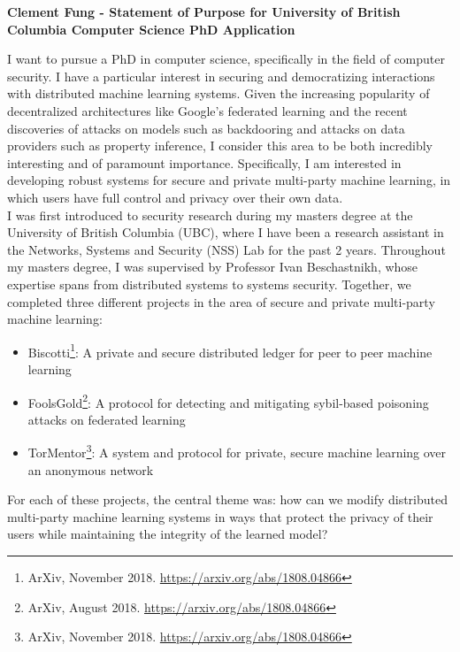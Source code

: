 \documentclass[10pt]{article} %
\begin{document}
\begin{center}
{\large \bf Clement Fung - Statement of Purpose for University of British Columbia Computer Science PhD Application}
\end{center}

I want to pursue a PhD in computer science, specifically in the field of computer security. I have a particular interest in securing and democratizing interactions with distributed machine learning systems. Given the increasing popularity of decentralized architectures like Google’s federated learning and the recent discoveries of attacks on models such as backdooring and attacks on data providers such as property inference, I consider this area to be both incredibly interesting and of paramount importance. Specifically, I am interested in developing robust systems for secure and private multi-party machine learning, in which users have full control and privacy over their own data. \\

I was first introduced to security research during my masters degree at the University of British Columbia (UBC), where I have been a research assistant in the Networks, Systems and Security (NSS) Lab for the past 2 years. Throughout my masters degree, I was supervised by Professor Ivan Beschastnikh, whose expertise spans from distributed systems to systems security. Together, we completed three different projects in the area of secure and private multi-party machine learning:
\begin{itemize}
\item Biscotti\footnote{ArXiv, November 2018. \url{https://arxiv.org/abs/1808.04866}}: A private and secure distributed ledger for peer to peer machine learning
\item FoolsGold\footnote{ArXiv, August 2018. \url{https://arxiv.org/abs/1808.04866}}: A protocol for detecting and mitigating sybil-based poisoning attacks on federated learning
\item TorMentor\footnote{ArXiv, November 2018. \url{https://arxiv.org/abs/1808.04866}}: A system and protocol for private, secure machine learning over an anonymous network
\end{itemize}

For each of these projects, the central theme was: how can we modify distributed multi-party machine learning systems in ways that protect the privacy of their users while maintaining the integrity of the learned model? \\
\end{document}

